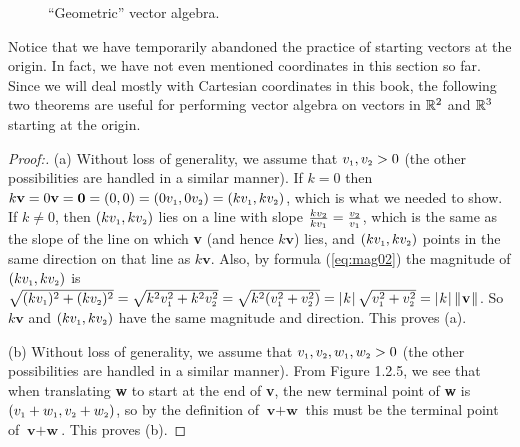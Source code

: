 \begin{figure}[h]
 \centering
 \qquad
 \qquad
 \caption[]{\quad ``Geometric'' vector algebra.}
 \label{fig:pgram}
\end{figure}

Notice that we have temporarily abandoned the practice of starting vectors at the origin. In fact, we have not even
mentioned coordinates in this section so far. Since we will deal mostly with Cartesian coordinates in this book, the
following two theorems are useful for performing vector algebra on vectors in $\mathbb{R}^{2}$ and $\mathbb{R}^{3}$
starting at the origin.

\begin{proofbar}\vspace{-3mm}\begin{proof}[Proof:] (a)
 Without loss of generality, we assume that $v_{\scriptscriptstyle 1}, v_{\scriptscriptstyle 2} > 0$ (the other
 possibilities are handled in a similar manner). If $k = 0$ then $k\textbf{v} = 0\textbf{v} = \textbf{0} = (0,0)
 = (0v_{\scriptscriptstyle 1},0v_{\scriptscriptstyle 2}) = (kv_{\scriptscriptstyle 1},kv_{\scriptscriptstyle 2})$, which
 is what we needed to show. If $k \ne 0$, then $(kv_{\scriptscriptstyle 1},kv_{\scriptscriptstyle 2})$ lies on a line
 with slope $\frac{kv_{\scriptscriptstyle 2}}{kv_{\scriptscriptstyle 1}} =
 \frac{v_{\scriptscriptstyle 2}}{v_{\scriptscriptstyle 1}}$, which is the same as the slope of the line on which
 \textbf{v} (and hence $k\textbf{v}$) lies, and $(kv_{\scriptscriptstyle 1},kv_{\scriptscriptstyle 2})$ points in the
 same direction on that line as $k\textbf{v}$.  Also, by formula (\ref{eq:mag02}) the magnitude of
 $(kv_{\scriptscriptstyle 1},kv_{\scriptscriptstyle 2})$ is $\sqrt{(kv_{\scriptscriptstyle 1})^2 +
 (kv_{\scriptscriptstyle 2})^2} = \sqrt{k^2 v_{\scriptscriptstyle 1}^2 + k^2 v_{\scriptscriptstyle 2}^2} = \sqrt{k^2 (v_{\scriptscriptstyle 1}^2 + v_{\scriptscriptstyle 2}^2)} =
 \lvert\mspace{1mu}k\mspace{1mu}\rvert \,\sqrt{v_{\scriptscriptstyle 1}^2 + v_{\scriptscriptstyle 2}^2} = \lvert\mspace{1mu}k\mspace{1mu}\rvert \,\lVert\mspace{1mu}\textbf{v}\mspace{1mu}\rVert$.
 So $k\textbf{v}$ and $(kv_{\scriptscriptstyle 1},kv_{\scriptscriptstyle 2})$ have the same magnitude and direction.
 This proves (a).\vspace{1mm}
 
 \piccaption[]{}
 \par\noindent(b)
 Without loss of generality, we assume that $v_{\scriptscriptstyle 1}, v_{\scriptscriptstyle 2},
 w_{\scriptscriptstyle 1},w_{\scriptscriptstyle 2} > 0$ (the other possibilities are handled in a similar manner).
 From Figure 1.2.5, we see that when translating \textbf{w} to start at the end of \textbf{v}, the new
 terminal point of \textbf{w} is $(v_{\scriptscriptstyle 1} + w_{\scriptscriptstyle 1}, v_{\scriptscriptstyle 2} + w_{\scriptscriptstyle 2})$, so by the definition of $\textbf{v} + \textbf{w}$ this must
 be the terminal point of $\textbf{v} + \textbf{w}$. This proves (b).\vspace{-3mm}
\end{proof}\end{proofbar}
